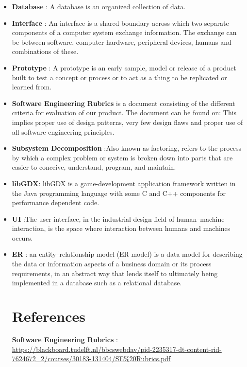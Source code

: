 \documentclass{article}
\begin{document}
	\begin{itemize}
		\item \textbf{Database} : A database is an organized collection of data.
		\item \textbf{Interface} : An interface is a shared boundary across which two separate components of a computer system exchange information. The exchange can be between software, computer hardware, peripheral devices, humans and combinations of these. 
		\item \textbf{Prototype} : A prototype is an early sample, model or release of a product built to test a concept or process or to act as a thing to be replicated or learned from.
		\item \textbf{Software Engineering Rubrics} is a document consisting of the different criteria for evaluation of our product. The document can be found on:  This implies proper use of design patterns, very few design flaws and proper use of all software engineering principles.
		\item \textbf{Subsystem Decomposition} :Also known as factoring, refers to the process by which a complex problem or system is broken down into parts that are easier to conceive, understand, program, and maintain.
		\item \textbf{libGDX}: libGDX is a game-development application framework written in the Java programming language with some C and C++ components for performance dependent code.
		\item \textbf{UI} :The user interface, in the industrial design field of human–machine interaction, is the space where interaction between humans and machines occurs.
		\item \textbf{ER} : an entity–relationship model (ER model) is a data model for describing the data or information aspects of a business domain or its process requirements, in an abstract way that lends itself to ultimately being implemented in a database such as a relational database.

		\section{References}
		
			\textbf{Software Engineering Rubrics} : \url{https://blackboard.tudelft.nl/bbcswebdav/pid-2235317-dt-content-rid-7624672_2/courses/30183-131404/SE\%20Rubrics.pdf}
 
		
	\end{itemize}


	
\end{document}
